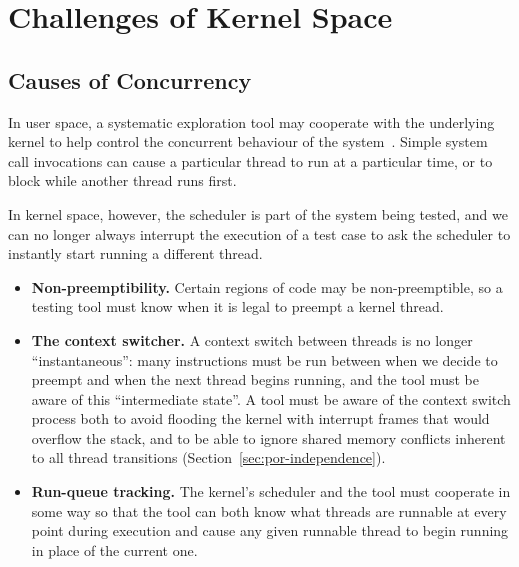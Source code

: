 \chapter{Challenges of Kernel Space}
\label{sec:challenges}


\section{Causes of Concurrency}

In user space, a systematic exploration tool may cooperate with the underlying kernel to help control the concurrent behaviour of the system~\cite{dbug-ssv}. Simple system call invocations can cause a particular thread to run at a particular time, or to block while another thread runs first.

In kernel space, however, the scheduler is part of the system being tested, and we can no longer always interrupt the execution of a test case to ask the scheduler to instantly start running a different thread.
\begin{itemize}
	\item {\bf Non-preemptibility.} Certain regions of code may be non-preemptible, so a testing tool must know when it is legal to preempt a kernel thread.
	\item {\bf The context switcher.} A context switch between threads is no longer ``instantaneous'': many instructions must be run between when we decide to preempt and when the next thread begins running, and the tool must be aware of this ``intermediate state''. A tool must be aware of the context switch process both to avoid flooding the kernel with interrupt frames that would overflow the stack, and to be able to ignore shared memory conflicts inherent to all thread transitions (Section~\ref{sec:por-independence}).
	\item {\bf Run-queue tracking.} The kernel's scheduler and the tool must cooperate in some way so that the tool can both know what threads are runnable at every point during execution and cause any given runnable thread to begin running in place of the current one.
\end{itemize}

